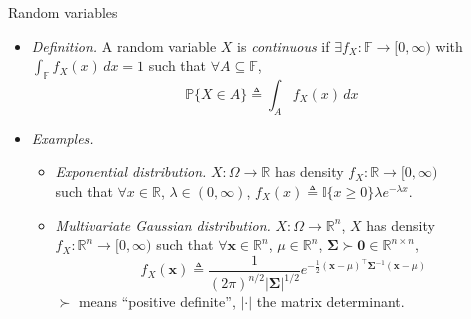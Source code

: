 \documentclass{beamer}
\numberwithin{equation}{section}
\begin{document}
\begin{frame}{Random variables}
    \begin{itemize}
        \item
        \textit{Definition.} A random variable $ X $ is \textit{continuous} if
        $ \exists f_X : \mathbb{F} \rightarrow [0, \infty) $ with
        $ \int_\mathbb{F}f_X(x)\,dx = 1 $ such that $ \forall A \subseteq
        \mathbb{F} $,
        \begin{equation*}
            \mathbb{P}\{X \in A\} \triangleq \int_Af_X(x)\,dx
        \end{equation*}

        \vspace{-5 pt}

        \item
        \textit{Examples.}
        \begin{itemize}
            \item
            \textit{Exponential distribution.}
            $ X : \Omega \rightarrow \mathbb{R} $ has density
            $ f_X : \mathbb{R} \rightarrow [0, \infty) $ \\ such that
            $ \forall x \in \mathbb{R} $, $ \lambda \in (0, \infty) $,
            $ f_X(x) \triangleq \mathbb{I}\{x \ge 0\}\lambda e^{-\lambda x} $.

            \item
            \textit{Multivariate Gaussian distribution.}
            $ X : \Omega \rightarrow \mathbb{R}^n $, $ X $ has density
            $ f_X : \mathbb{R}^n \rightarrow [0, \infty) $ such that
            $ \forall \mathbf{x} \in \mathbb{R}^n $, $ \mu \in \mathbb{R}^n $,
            $ \mathbf{\Sigma} \succ \mathbf{0} \in \mathbb{R}^{n \times n} $,
            \begin{equation*}
                f_X(\mathbf{x}) \triangleq
                \frac{1}{(2\pi)^{n / 2}|\mathbf{\Sigma}|^{1 / 2}}
                e^{
                    -\frac{1}{2}(\mathbf{x} - \mu)^\top\mathbf{\Sigma}^{-1}
                    (\mathbf{x} - \mu)
                }
            \end{equation*}
            $ \succ $ means ``positive definite'', $ |\cdot| $ the matrix
            determinant.
        \end{itemize}
    \end{itemize}
\end{frame}
\end{document}
